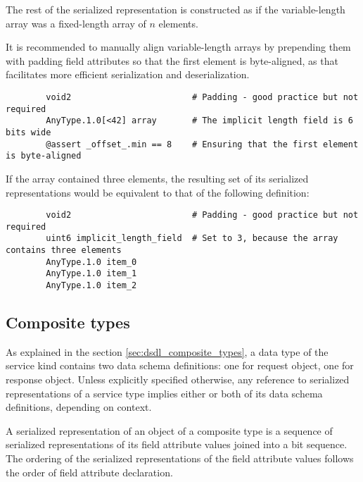 The rest of the serialized representation is constructed as if the variable-length array was
a fixed-length array of $n$ elements.

\begin{remark}
    It is recommended to manually align variable-length arrays by prepending them with padding field attributes
    so that the first element is byte-aligned, as that facilitates more efficient serialization and deserialization.

    \begin{verbatim}
        void2                        # Padding - good practice but not required
        AnyType.1.0[<42] array       # The implicit length field is 6 bits wide
        @assert _offset_.min == 8    # Ensuring that the first element is byte-aligned
    \end{verbatim}

    If the array contained three elements,
    the resulting set of its serialized representations would be equivalent to that of the following definition:

    \begin{verbatim}
        void2                        # Padding - good practice but not required
        uint6 implicit_length_field  # Set to 3, because the array contains three elements
        AnyType.1.0 item_0
        AnyType.1.0 item_1
        AnyType.1.0 item_2
    \end{verbatim}
\end{remark}

\subsection{Composite types}

As explained in the section \ref{sec:dsdl_composite_types}, a data type of the service kind contains
two data schema definitions: one for request object, one for response object.
Unless explicitly specified otherwise, any reference to serialized representations of a service type
implies either or both of its data schema definitions, depending on context.

A serialized representation of an object of a composite type is a sequence of serialized representations of
its field attribute values joined into a bit sequence.
The ordering of the serialized representations of the field attribute values follows the order
of field attribute declaration.

